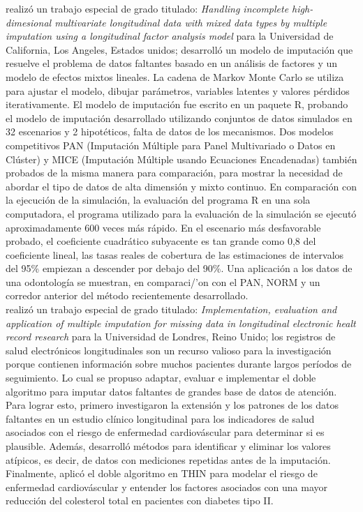 \citet{mixed} realiz\'o un trabajo especial de grado titulado: \textit{Handling incomplete high-dimesional multivariate longitudinal data with mixed data types by multiple imputation using a longitudinal factor analysis model} para la Universidad de California, Los Angeles, Estados unidos; desarroll\'o un modelo de imputaci\'on que resuelve el problema de datos faltantes basado en un an\'alisis de factores y un modelo de efectos mixtos lineales. La cadena de Markov Monte Carlo se utiliza para ajustar el modelo, dibujar par\'ametros, variables latentes y valores p\'erdidos iterativamente. El modelo de imputaci\'on fue escrito en un paquete R, probando el modelo de imputaci\'on desarrollado utilizando conjuntos de datos simulados en 32 escenarios y 2 hipot\'eticos, falta de datos de los mecanismos. Dos modelos competitivos PAN (Imputaci\'on M\'ultiple para Panel Multivariado o Datos en Cl\'uster) y MICE (Imputaci\'on M\'ultiple usando Ecuaciones Encadenadas) tambi\'en probados de la misma manera para comparaci\'on, para mostrar la necesidad de abordar el tipo de datos de alta dimensi\'on y mixto continuo. En comparaci\'on con la ejecuci\'on de la simulaci\'on, la evaluaci\'on del programa R en una sola computadora, el programa utilizado para la evaluaci\'on de la simulaci\'on se ejecut\'o aproximadamente 600 veces m\'as r\'apido. En el escenario m\'as desfavorable probado, el coeficiente cuadr\'atico subyacente es tan grande como 0,8 del coeficiente lineal, las tasas reales de cobertura de las estimaciones de intervalos del 95\% empiezan a descender por debajo del 90\%. Una aplicaci\'on a los datos de una odontolog\'ia se muestran, en comparaci/'on con el PAN, NORM y un corredor anterior del m\'etodo recientemente desarrollado.\\

\citet{health} realiz\'o un trabajo especial de grado titulado: \textit{Implementation, evaluation and application of multiple imputation for missing data in longitudinal electronic healt record research} para la Universidad de Londres, Reino Unido; los registros de salud electr\'onicos longitudinales son un recurso valioso para la investigaci\'on porque contienen informaci\'on sobre muchos pacientes durante largos per\'iodos de seguimiento. Lo cual se propuso adaptar, evaluar e implementar el doble algoritmo para imputar datos faltantes de grandes base de datos de atenci\'on. Para lograr esto, primero investigaron la extensi\'on y los patrones de los datos faltantes en un estudio cl\'inico longitudinal para los indicadores de salud asociados con el riesgo de enfermedad cardiov\'ascular para determinar si es plausible. Adem\'as, desarroll\'o m\'etodos para identificar y eliminar los valores at\'ipicos, es decir, de datos con mediciones repetidas antes de la imputaci\'on. Finalmente, aplic\'o el doble algoritmo en THIN para modelar el riesgo de enfermedad cardiov\'ascular y entender los factores asociados con una mayor reducci\'on del colesterol total en pacientes con diabetes tipo II. \\

